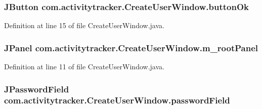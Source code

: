 \subsubsection[{\texorpdfstring{button\+Ok}{buttonOk}}]{\setlength{\rightskip}{0pt plus 5cm}J\+Button com.\+activitytracker.\+Create\+User\+Window.\+button\+Ok\hspace{0.3cm}{\ttfamily [private]}}\hypertarget{classcom_1_1activitytracker_1_1_create_user_window_aa22864c8baa65b46fe9a7621748d7841}{}\label{classcom_1_1activitytracker_1_1_create_user_window_aa22864c8baa65b46fe9a7621748d7841}


Definition at line 15 of file Create\+User\+Window.\+java.

\subsubsection[{\texorpdfstring{m\+\_\+root\+Panel}{m_rootPanel}}]{\setlength{\rightskip}{0pt plus 5cm}J\+Panel com.\+activitytracker.\+Create\+User\+Window.\+m\+\_\+root\+Panel\hspace{0.3cm}{\ttfamily [private]}}\hypertarget{classcom_1_1activitytracker_1_1_create_user_window_a5a678326afe519b6a2c9e7a2d9eff87c}{}\label{classcom_1_1activitytracker_1_1_create_user_window_a5a678326afe519b6a2c9e7a2d9eff87c}


Definition at line 11 of file Create\+User\+Window.\+java.

\subsubsection[{\texorpdfstring{password\+Field}{passwordField}}]{\setlength{\rightskip}{0pt plus 5cm}J\+Password\+Field com.\+activitytracker.\+Create\+User\+Window.\+password\+Field\hspace{0.3cm}{\ttfamily [private]}}\hypertarget{classcom_1_1activitytracker_1_1_create_user_window_a29be9c267c003ae90731199d8257dc0a}{}\label{classcom_1_1activitytracker_1_1_create_user_window_a29be9c267c003ae90731199d8257dc0a}



